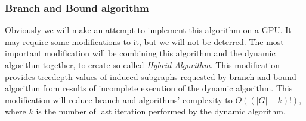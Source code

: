 \subsubsection{Branch and Bound algorithm}
Obviously we will make an attempt to implement this algorithm on a GPU. It may require some modifications to it, but we will not be deterred. The most important modification will be combining this algorithm and the dynamic algorithm together, to create so called \emph{Hybrid Algorithm}. This modification provides treedepth values of induced subgraphs requested by branch and bound algorithm from results of incomplete execution of the dynamic algorithm. This modification will reduce branch and algorithms' complexity to $O\left(\left(\left|G\right|-k\right)!\right)$, where $k$ is the number of last iteration performed by the dynamic algorithm.
